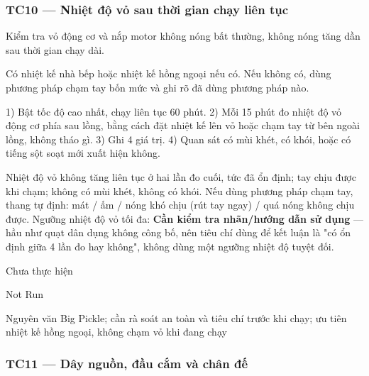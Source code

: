 \subsubsection{TC10 --- Nhiệt độ vỏ sau thời gian chạy liên tục}\label{tc10-nhiux1ec7t-ux111ux1ed9-vux1ecf-sau-thux1eddi-gian-chux1ea1y-liuxean-tux1ee5c}

\begin{description}
\tightlist
\item[Objective]
Kiểm tra vỏ động cơ và nắp motor không nóng bất thường, không nóng tăng dần sau thời gian chạy dài.
\item[Input]
Có nhiệt kế nhà bếp hoặc nhiệt kế hồng ngoại nếu có. Nếu không có, dùng phương pháp chạm tay bốn mức và ghi rõ đã dùng phương pháp nào.
\item[Steps]
1) Bật tốc độ cao nhất, chạy liên tục 60 phút. 2) Mỗi 15 phút đo nhiệt độ vỏ động cơ phía sau lồng, bằng cách đặt nhiệt kế lên vỏ hoặc chạm tay từ bên ngoài lồng, không tháo gì. 3) Ghi 4 giá trị. 4) Quan sát có mùi khét, có khói, hoặc có tiếng sột soạt mới xuất hiện không.
\item[Expected]
Nhiệt độ vỏ không tăng liên tục ở hai lần đo cuối, tức đã ổn định; tay chịu được khi chạm; không có mùi khét, không có khói. Nếu dùng phương pháp chạm tay, thang tự định: mát / ấm / nóng khó chịu (rút tay ngay) / quá nóng không chịu được. Ngưỡng nhiệt độ vỏ tối đa: \textbf{Cần kiểm tra nhãn/hướng dẫn sử dụng} --- hầu như quạt dân dụng không công bố, nên tiêu chí dùng để kết luận là "có ổn định giữa 4 lần đo hay không", không dùng một ngưỡng nhiệt độ tuyệt đối.
\item[Actual]
Chưa thực hiện
\item[Verdict]
Not Run
\item[Ghi chú rà soát]
Nguyên văn Big Pickle; cần rà soát an toàn và tiêu chí trước khi chạy; ưu tiên nhiệt kế hồng ngoại, không chạm vỏ khi đang chạy
\end{description}

\subsubsection{TC11 --- Dây nguồn, đầu cắm và chân đế}\label{tc11-duxe2y-nguux1ed3n-ux111ux1ea7u-cux1eafm-vuxe0-chuxe2n-ux111ux1ebf}

